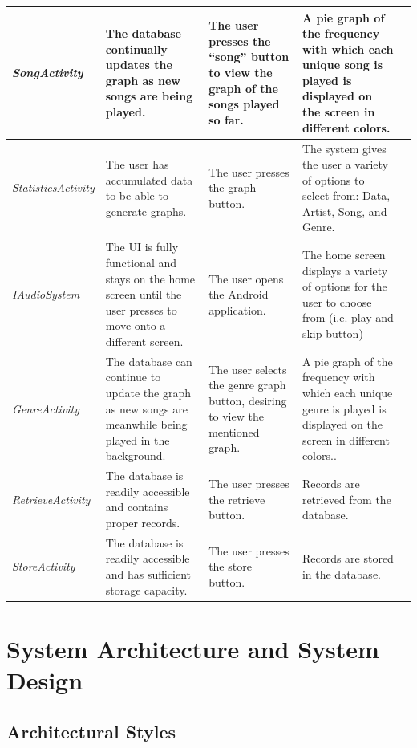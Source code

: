 \documentclass[letterpaper,english, 12pt]{scrreprt}
\begin{document}
\begin{center}
\begin{tabular}{|l|C{4cm}|C{4cm}|C{4cm}|C{4cm}|}
 \textit{SongActivity}			&	The database continually updates the graph as new songs are being played.						&	The user presses the “song” button to view the graph of the songs played so far.								&	A pie graph of the frequency with which each unique song is played is displayed on the screen in different colors.		\\ \hline
 \textit{StatisticsActivity}			&	The user has accumulated data to be able to generate graphs. 								&	The user presses the graph button.															&	The system gives the user a variety of options to select from: Data, Artist, Song, and Genre.		\\ \hline
 \textit{IAudioSystem}			&	The UI is fully functional and stays on the home screen until the user presses to move onto a different screen.	&	The user opens the Android application.															&	The home screen displays a variety of options for the user to choose from (i.e. play and skip button)	\\ \hline
 \textit{GenreActivity}			&	The database can continue to update the graph as new songs are meanwhile being played in the background.	&	The user selects the genre graph button, desiring to view the mentioned graph.									&	A pie graph of the frequency with which each unique genre is played is displayed on the screen in different colors.. 	\\ \hline
 \textit{RetrieveActivity}			&	The database is readily accessible and contains proper records.								&	The user presses the retrieve button.															&	Records are retrieved from the database.				\\ \hline
 \textit{StoreActivity}			&	The database is readily accessible and has sufficient storage capacity.							&	The user presses the store button.															&	Records are stored in the database.
	\end{tabular}
\end{center}



\chapter{System Architecture and System Design}

\section{Architectural Styles}
\end{document}
